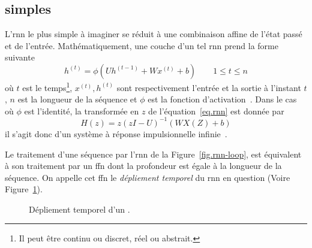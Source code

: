 \subsection{ simples}

L'\gls{rnn} le plus simple à imaginer se réduit à une combinaison affine de l'état passé et de l'entrée.
Mathématiquement, une couche d'un tel \gls{rnn} prend la forme suivante
\begin{equation}
    \label{eq.rnn}
    h^{(t)} = \phi\left(Uh^{(t-1)} + Wx^{(t)} + b\right) \qquad 1 \le t \le n
\end{equation}
où \(t\) est le temps\footnote{Il peut être continu ou discret, réel ou abstrait.},
\(x^{(t)}, h^{(t)}\) sont respectivement l'entrée et la sortie à l'instant \(t\), 
\(n\) est la longueur de la séquence et \(\phi\) est la fonction d'activation~\cite{Fathi_2021}.
Dans le cas où \(\phi\) est l'identité,  
la transformée en \(z\) de l'équation~\ref{eq.rnn} est donnée par 
\begin{equation}
    \label{eq.rnn-tz}
    H(z) = z\left(zI - U\right)^{-1} \left(WX(Z) + b\right)
\end{equation}
il s'agit donc d'un système à réponse impulsionnelle infinie~\cite{Fathi_2021}.

Le traitement d'une séquence par l'\gls{rnn} de la Figure~\ref{fig.rnn-loop}, 
est équivalent à son traitement par un \gls{ffn} dont la profondeur est égale à la longueur de la séquence.
On appelle cet \gls{ffn} le \emph{dépliement temporel} du \gls{rnn} en question 
(Voire Figure~\ref{fig.rnn-unfold}).

\begin{figure}[hbt]
    \centering
    \caption{Dépliement temporel d'un .}
    \label{fig.rnn-unfold}
\end{figure}


